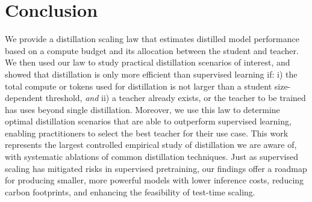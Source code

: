\section{Conclusion}
\label{sec:conclusion}
\glsresetall
We provide a distillation scaling law that estimates distilled model performance based on a compute budget and its allocation between the student and teacher.
We then used our law to study practical distillation scenarios of interest,
and showed that distillation is only more efficient than supervised learning if:
i) the total compute or tokens used for distillation is not larger than a student size-dependent threshold,
\emph{and} ii) a teacher already exists, or the teacher to be trained has uses beyond single distillation.
Moreover, we use this law to determine optimal distillation scenarios that are able to outperform supervised learning,
enabling practitioners to select the best teacher for their use case.
This work represents the largest controlled empirical study of distillation we are aware of,
with systematic ablations of common distillation techniques.
Just as supervised scaling has mitigated risks in supervised pretraining, our findings offer a roadmap for producing smaller, more powerful models with lower inference costs, reducing carbon footprints, and enhancing the feasibility of test-time scaling.


